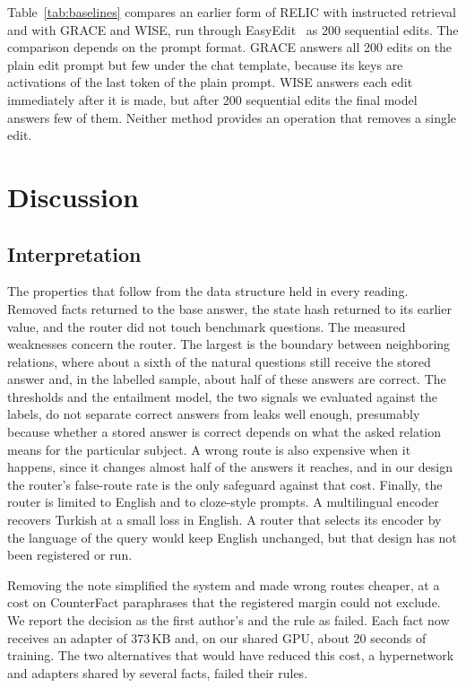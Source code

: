 \documentclass[journal,10pt]{IEEEtran}
\begin{document}
Table~\ref{tab:baselines} compares an earlier form of RELIC with instructed retrieval and with GRACE and WISE, run
through EasyEdit~\cite{wang2024easyedit} as 200 sequential edits. The comparison depends on the prompt format.
GRACE answers all 200 edits on the plain edit prompt but few under the chat template, because its keys are
activations of the last token of the plain prompt. WISE answers each edit immediately after it is made, but after
200 sequential edits the final model answers few of them. Neither method provides an operation that removes a
single edit.

\section{Discussion}
\label{sec:discussion}

\subsection{Interpretation}
The properties that follow from the data structure held in every reading. Removed facts returned to the base
answer, the state hash returned to its earlier value, and the router did not touch benchmark questions. The
measured weaknesses concern the router. The largest is the boundary between neighboring relations, where about a
sixth of the natural questions still receive the stored answer and, in the labelled sample, about half of these
answers are correct. The thresholds and the entailment model, the two signals we evaluated against the labels, do
not separate correct answers from leaks well enough, presumably because whether a stored answer is correct
depends on what the asked relation means for the particular subject. A wrong route is also expensive when it
happens, since it changes almost half of the answers it reaches, and in our design the router's false-route rate
is the only safeguard against that cost. Finally, the router is limited to English and to cloze-style prompts.
A multilingual encoder recovers Turkish at a small loss in English. A router that selects its encoder by the
language of the query would keep English unchanged, but that design has not been registered or run.

Removing the note simplified the system and made wrong routes cheaper, at a cost on CounterFact paraphrases that
the registered margin could not exclude. We report the decision as the first author's and the rule as failed. Each
fact now receives an adapter of 373\,KB and, on our shared GPU, about 20 seconds of training. The two alternatives
that would have reduced this cost, a hypernetwork and adapters shared by several facts, failed their rules.
\end{document}
